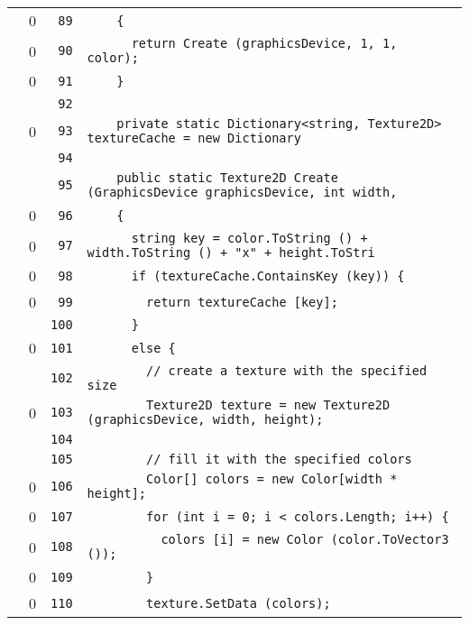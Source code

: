 \documentclass[a4paper,10pt]{article}
\begin{document}
\begin{longtable}[l]{lrrl}
\cellcolor{red} & 0 & \verb~89~ & \verb~    {~\\
\cellcolor{red} & 0 & \verb~90~ & \verb~      return Create (graphicsDevice, 1, 1, color);~\\
\cellcolor{red} & 0 & \verb~91~ & \verb~    }~\\
\cellcolor{gray} &  & \verb~92~ & \verb~~\\
\cellcolor{red} & 0 & \verb~93~ & \verb~    private static Dictionary<string, Texture2D> textureCache = new Dictionary~\\
\cellcolor{gray} &  & \verb~94~ & \verb~~\\
\cellcolor{gray} &  & \verb~95~ & \verb~    public static Texture2D Create (GraphicsDevice graphicsDevice, int width, ~\\
\cellcolor{red} & 0 & \verb~96~ & \verb~    {~\\
\cellcolor{red} & 0 & \verb~97~ & \verb~      string key = color.ToString () + width.ToString () + "x" + height.ToStri~\\
\cellcolor{red} & 0 & \verb~98~ & \verb~      if (textureCache.ContainsKey (key)) {~\\
\cellcolor{red} & 0 & \verb~99~ & \verb~        return textureCache [key];~\\
\cellcolor{gray} &  & \verb~100~ & \verb~      }~\\
\cellcolor{red} & 0 & \verb~101~ & \verb~      else {~\\
\cellcolor{gray} &  & \verb~102~ & \verb~        // create a texture with the specified size~\\
\cellcolor{red} & 0 & \verb~103~ & \verb~        Texture2D texture = new Texture2D (graphicsDevice, width, height);~\\
\cellcolor{gray} &  & \verb~104~ & \verb~~\\
\cellcolor{gray} &  & \verb~105~ & \verb~        // fill it with the specified colors~\\
\cellcolor{red} & 0 & \verb~106~ & \verb~        Color[] colors = new Color[width * height];~\\
\cellcolor{red} & 0 & \verb~107~ & \verb~        for (int i = 0; i < colors.Length; i++) {~\\
\cellcolor{red} & 0 & \verb~108~ & \verb~          colors [i] = new Color (color.ToVector3 ());~\\
\cellcolor{red} & 0 & \verb~109~ & \verb~        }~\\
\cellcolor{red} & 0 & \verb~110~ & \verb~        texture.SetData (colors);~\\

\end{longtable}
\end{document}
